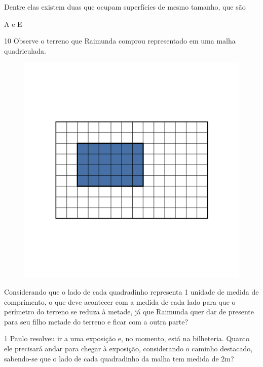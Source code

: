 Dentre elas existem duas que ocupam superfícies de mesmo tamanho, que são

  A e E



\num{10} Observe o terreno que Raimunda comprou representado em uma malha
quadriculada.

\begin{figure}[htpb!]
\includegraphics[width=\textwidth]{../ilustracoes/MAT5/SAEB_5ANO_MAT_figura45.png}
\end{figure}

Considerando que o lado de cada quadradinho representa 1 unidade de
medida de comprimento, o que deve acontecer com a medida de cada lado
para que o perímetro do terreno se reduza à metade, já que Raimunda quer
dar de presente para seu filho metade do terreno e ficar com a outra
parte?



\num{1} Paulo resolveu ir a uma exposição e, no momento, está na bilheteria. Quanto ele precisará andar para chegar à exposição,
considerando o caminho destacado, sabendo-se que o lado de cada quadradinho da malha tem medida de 2m?

